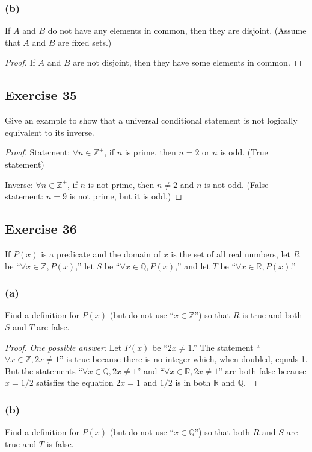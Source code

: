 \documentclass[14pt]{extarticle}
\newcommand{\R}{\mathbb{R}}
\newcommand{\Z}{\mathbb{Z}}
\newcommand{\Q}{\mathbb{Q}}
\newcommand{\fa}{\forall}
\begin{document}
\subsubsection{(b)}
If $A$ and $B$ do not have any elements in common, then they are disjoint. (Assume that $A$ and $B$ are fixed sets.)

\begin{proof}
If $A$ and $B$ are not disjoint, then they have some elements in common.
\end{proof}

\subsection{Exercise 35}
Give an example to show that a universal conditional statement is not logically equivalent to its inverse.

\begin{proof}
Statement: $\fa n \in \Z^+$, if $n$ is prime, then $n = 2$ or $n$ is odd. (True statement)

Inverse: $\fa n \in \Z^+$, if $n$ is not prime, then $n \neq 2$ and $n$ is not odd. (False statement: $n = 9$ is not prime, but it is odd.)
\end{proof}

\subsection{Exercise 36}
If $P(x)$ is a predicate and the domain of $x$ is the set of all real numbers, let $R$ be “$\fa x \in \Z, P(x)$,” let $S$ be “$\fa x \in \Q, P(x)$,” and let $T$ be “$\fa x \in \R, P(x)$.”

\subsubsection{(a)}
Find a definition for $P(x)$ (but do not use “$x \in \Z$”) so that $R$ is true and both $S$ and $T$ are false.

\begin{proof}
{\it One possible answer:} Let $P(x)$ be “$2x \neq 1$.” The
statement “$\fa x \in \Z, 2x \neq 1$” is true because there is no integer which, when doubled, equals 1. But the statements “$\fa x \in \Q, 2x \neq 1$” and “$\fa x \in \R, 2x \neq 1$” are both false because $x = 1/2$ satisfies the equation $2x = 1$ and $1/2$ is in both $\R$ and $\Q$.
\end{proof}

\subsubsection{(b)}
Find a definition for $P(x)$ (but do not use “$x \in \Q$”) so that both $R$ and $S$ are true and $T$ is false.
\end{document}
